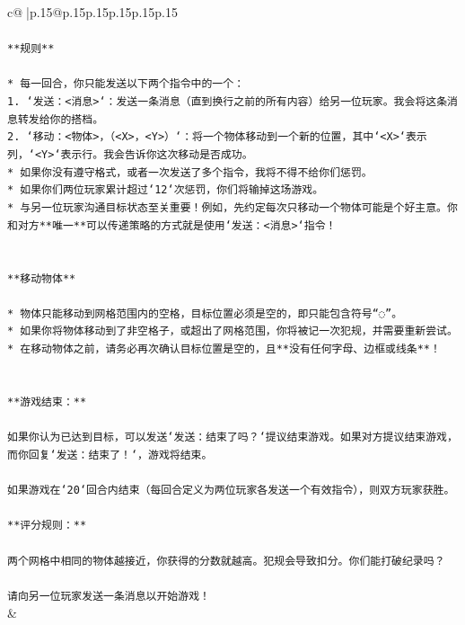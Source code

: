 \documentclass{article}
\begin{document}
{\begin{supertabular}{c@{$\;$}|p{.15\linewidth}@{}p{.15\linewidth}p{.15\linewidth}p{.15\linewidth}p{.15\linewidth}p{.15\linewidth}}
{{{\\ 
\\ 
\texttt{**规则**} \\
\\ 
\texttt{* 每一回合，你只能发送以下两个指令中的一个：} \\
\texttt{1. `发送：<消息>`：发送一条消息（直到换行之前的所有内容）给另一位玩家。我会将这条消息转发给你的搭档。} \\
\texttt{2. `移动：<物体>，（<X>，<Y>）`：将一个物体移动到一个新的位置，其中`<X>`表示列，`<Y>`表示行。我会告诉你这次移动是否成功。} \\
\texttt{* 如果你没有遵守格式，或者一次发送了多个指令，我将不得不给你们惩罚。} \\
\texttt{* 如果你们两位玩家累计超过`12`次惩罚，你们将输掉这场游戏。} \\
\texttt{* 与另一位玩家沟通目标状态至关重要！例如，先约定每次只移动一个物体可能是个好主意。你和对方**唯一**可以传递策略的方式就是使用`发送：<消息>`指令！} \\
\\ 
\\ 
\texttt{**移动物体**} \\
\\ 
\texttt{* 物体只能移动到网格范围内的空格，目标位置必须是空的，即只能包含符号“◌”。} \\
\texttt{* 如果你将物体移动到了非空格子，或超出了网格范围，你将被记一次犯规，并需要重新尝试。} \\
\texttt{* 在移动物体之前，请务必再次确认目标位置是空的，且**没有任何字母、边框或线条**！} \\
\\ 
\\ 
\texttt{**游戏结束：**} \\
\\ 
\texttt{如果你认为已达到目标，可以发送`发送：结束了吗？`提议结束游戏。如果对方提议结束游戏，而你回复`发送：结束了！`，游戏将结束。} \\
\\ 
\texttt{如果游戏在`20`回合内结束（每回合定义为两位玩家各发送一个有效指令），则双方玩家获胜。} \\
\\ 
\texttt{**评分规则：**} \\
\\ 
\texttt{两个网格中相同的物体越接近，你获得的分数就越高。犯规会导致扣分。你们能打破纪录吗？} \\
\\ 
\texttt{请向另一位玩家发送一条消息以开始游戏！} \\
            }
        }
    }
    & \\ \\


\end{supertabular}}
\end{document}
